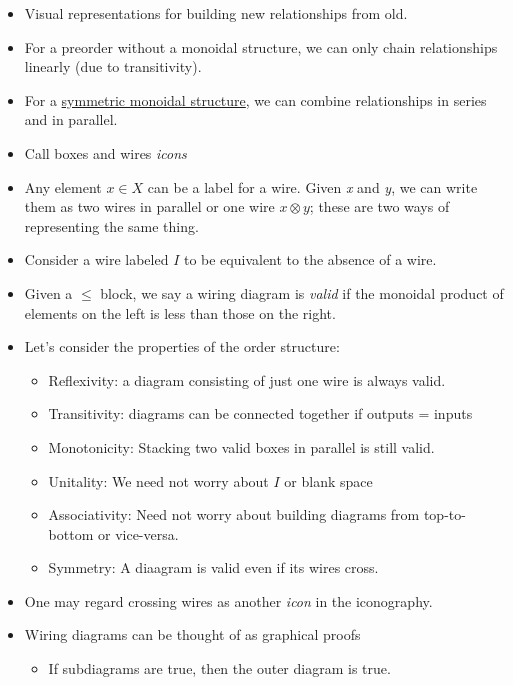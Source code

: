 \begin{itemize}
    \item Visual representations for building new relationships from old.
    \item For a preorder without a monoidal structure, we can only chain relationships linearly (due to transitivity).
    \item For a \href{doc/1 math/Seven Sketches in Compositionality/Chapter 2: Resource theories/2 Symmetric monoidal preorders/1 Definition and first examples/1 Symmetric monoidal structure on a preorder}{symmetric monoidal structure}, we can combine relationships in series and in parallel.
    \item Call boxes and wires \emph{icons}
    \item Any element $x \in X$ can be a label for a wire. Given \emph{x} and \emph{y}, we can write them as two wires in parallel or one wire $x \otimes y$; these are two ways of representing the same thing.
    \item Consider a wire labeled $I$ to be equivalent to the absence of a wire.
    \item Given a $\leq$ block, we say a wiring diagram is \emph{valid} if the monoidal product of elements on the left is less than those on the right.
    \item Let's consider the properties of the order structure:
          \begin{itemize}
            \item Reflexivity: a diagram consisting of just one wire is always valid.
            \item Transitivity: diagrams can be connected together if outputs = inputs
            \item Monotonicity: Stacking two valid boxes in parallel is still valid.
            \item Unitality: We need not worry about $I$ or blank space
            \item Associativity: Need not worry about building diagrams from top-to-bottom or vice-versa.
            \item Symmetry: A diaagram is valid even if its wires cross.
          \end{itemize}
    \item One may regard crossing wires as another \emph{icon} in the iconography.
    \item Wiring diagrams can be thought of as graphical proofs
          \begin{itemize}
            \item If subdiagrams are true, then the outer diagram is true.
          \end{itemize}
  \end{itemize}
